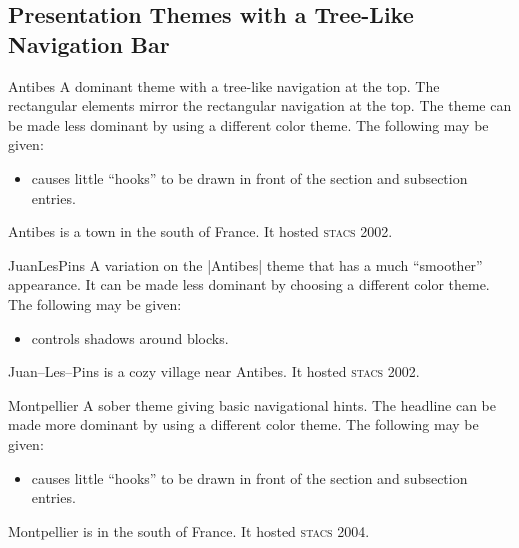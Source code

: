 \subsection{Presentation Themes with a Tree-Like Navigation Bar}

\begin{themeexample}{Antibes}
  A dominant theme with a tree-like navigation at the top. The rectangular elements mirror the rectangular navigation at the top. The theme can be made less dominant by using a different color theme. The following  may be given:
  \begin{itemize}
  \item {} causes little ``hooks'' to be drawn in front of the section and subsection entries.
  \end{itemize}

  Antibes is a town in the south of France. It hosted \textsc{stacs} 2002.
\end{themeexample}

\begin{themeexample}{JuanLesPins}
  A variation on the |Antibes| theme that has a much ``smoother'' appearance. It can be made less dominant by choosing a different color theme. The following  may be given:
  \begin{itemize}
  \item {} controls shadows around blocks.
  \end{itemize}

  Juan--Les--Pins is a cozy village near Antibes. It hosted \textsc{stacs} 2002.
\end{themeexample}

\begin{themeexample}{Montpellier}
  A sober theme giving basic navigational hints. The headline can be made more dominant by using a different color theme. The following  may be given:
  \begin{itemize}
  \item {} causes little ``hooks'' to be drawn in front of the section and subsection entries.
  \end{itemize}

  Montpellier is in the south of France. It hosted \textsc{stacs} 2004.
\end{themeexample}


